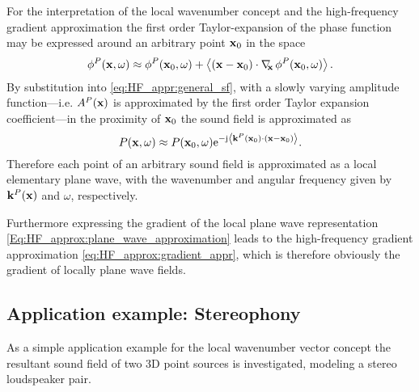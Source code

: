 \vspace{3mm}
For the interpretation of the local wavenumber concept and the high-frequency gradient approximation the first order Taylor-expansion of the phase function may be expressed around an arbitrary point $\mathbf{x}_0$ in the space
\begin{equation}
\phi^P(\mathbf{x},\omega) \approx \phi^P(\mathbf{x}_0,\omega) + \left< (\mathbf{x}-\mathbf{x}_0) \cdot \nabla_{\!\!\mathbf{x}}\, \phi^P(\mathbf{x}_0,\omega) \right>.
\end{equation}
By substitution into \eqref{eq:HF_appr:general_sf}, with a slowly varying amplitude function---i.e. $A^P(\mathbf{x})$ is approximated by the first order Taylor expansion coefficient---in the proximity of $\mathbf{x}_0$ the sound field is approximated as
\begin{equation}
\label{Eq:HF_approx:plane_wave_approximation}
P(\mathbf{x},\omega) \approx P(\mathbf{x}_0,\omega) \mathrm{e}^{-\mathrm{j}  \left< \mathbf{k}^P(\mathbf{x}_0) \cdot \left( \mathbf{x} - \mathbf{x}_0 \right) \right>}.
\end{equation}
Therefore each point of an arbitrary sound field is approximated as a local elementary plane wave, with the wavenumber and angular frequency given by $\mathbf{k}^P(\mathbf{x})$ and $\omega$, respectively.

Furthermore expressing the gradient of the local plane wave representation \eqref{Eq:HF_approx:plane_wave_approximation} leads to the high-frequency gradient approximation \eqref{eq:HF_approx:gradient_appr}, which is therefore obviously the gradient of locally plane wave fields.

\subsection*{Application example: Stereophony}

As a simple application example for the local wavenumber vector concept the resultant sound field of two 3D point sources is investigated, modeling a stereo loudspeaker pair.

